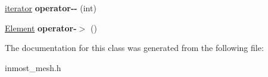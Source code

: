 \begin{DoxyCompactItemize}
\item 
\hypertarget{classINMOST_1_1Storage_1_1reference__array_1_1iterator_afab74602f97345e820b091c02bb30005}{\hyperlink{classINMOST_1_1Storage_1_1reference__array_1_1iterator}{iterator} {\bfseries operator-\/-\/} (int)}\label{classINMOST_1_1Storage_1_1reference__array_1_1iterator_afab74602f97345e820b091c02bb30005}

\item 
\hypertarget{classINMOST_1_1Storage_1_1reference__array_1_1iterator_ab65dc146de15948c9665e22341606c17}{\hyperlink{classINMOST_1_1Element}{Element} {\bfseries operator-\/$>$} ()}\label{classINMOST_1_1Storage_1_1reference__array_1_1iterator_ab65dc146de15948c9665e22341606c17}

\end{DoxyCompactItemize}


The documentation for this class was generated from the following file\-:\begin{DoxyCompactItemize}
\item 
inmost\-\_\-mesh.\-h\end{DoxyCompactItemize}
